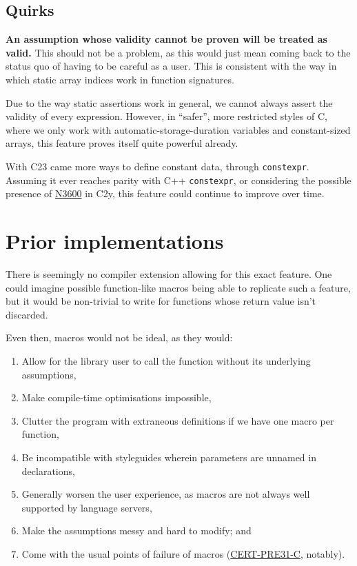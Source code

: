 \documentclass[a4paper, 12pt]{article}
\begin{document}
\subsection{Quirks}
\label{sec:orgbf35f50}
\textbf{An assumption whose validity cannot be proven will be treated as valid.}
This should not be a problem, as this would just mean coming back to the
status quo of having to be careful as a user.
This is consistent with the way in which static array indices work in
function signatures.

Due to the way static assertions work in general, we cannot always assert
the validity of every expression.  However, in ``safer'', more restricted
styles of C, where we only work with automatic-storage-duration variables
and constant-sized arrays, this feature proves itself quite powerful already.

With C23 came more ways to define constant data, through \texttt{constexpr}.  Assuming
it ever reaches parity with C++ \texttt{constexpr}, or considering the possible
presence of \href{https://open-std.org/jtc1/sc22/wg14/www/docs/n3600.htm}{N3600} in C2y, this feature could continue to improve over time.
\section{Prior implementations}
\label{sec:org9e29cb0}
There is seemingly no compiler extension allowing for this exact feature.  One
could imagine possible function-like macros being able to replicate such a
feature, but it would be non-trivial to write for functions whose return value
isn't discarded.

Even then, macros would not be ideal, as they would:
\begin{enumerate}
\item Allow for the library user to call the function without its underlying assumptions,
\item Make compile-time optimisations impossible,
\item Clutter the program with extraneous definitions if we have one macro per function,
\item Be incompatible with styleguides wherein parameters are unnamed in declarations,
\item Generally worsen the user experience, as macros are not always well supported
by language servers,
\item Make the assumptions messy and hard to modify; and
\item Come with the usual points of failure of macros (\href{https://wiki.sei.cmu.edu/confluence/display/c/PRE31-C.+Avoid+side+effects+in+arguments+to+unsafe+macros}{CERT-PRE31-C}, notably).
\end{enumerate}
\end{document}
